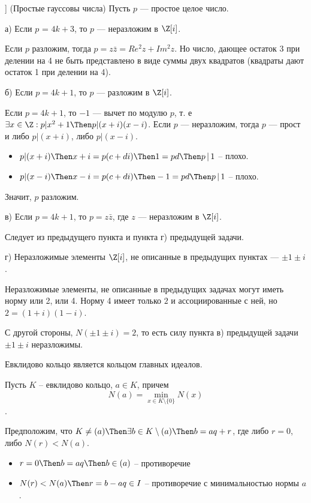 \begin{problem}[11 (3.3) [Каргальцев]]
	(Простые гауссовы числа) Пусть $p$ --- простое целое число.
\end{problem}

\begin{solution}
	
	а) Если \(p\) = \(4k + 3\), то \(p\) --- неразложим в \(\Z[i]\).
	
	Если \(p\) разложим, тогда \(p = z\bar{z} = Re^2z + Im^2z\). Но число, дающее остаток 3 при делении на 4 не быть представлено в виде суммы двух квадратов (квадраты дают остаток 1 при делении на 4).
	
	б) Если \(p = 4k + 1\), то \(p\) --- разложим в \(\Z[i]\).
	
	Если \(p = 4k + 1\), то \(-1\) --- вычет по модулю \(p\), т. е \(\exists x \in \Z: p| x^2 + 1 \Then p | (x + i)(x - i)\). Если \(p\) --- неразложим, тогда \(p\) --- прост и либо \(p| (x + i)\), либо \(p | (x - i)\). 
	
	\begin{itemize}
		\item $p| (x + i)\Then x + i = p(c + di)\Then 1 = pd \Then p\,|\,1$ -- плохо.
		\item $p| (x - i)\Then x - i = p(c + di)\Then -1 = pd \Then p\,|\,1$ -- плохо.
	\end{itemize}
	Значит, \(p\) разложим.
	
	в) Если \(p = 4k + 1\), то \(p = z\bar{z}\), где \(z\) --- неразложим в \(\Z[i]\).
	
	Следует из предыдущего пункта и пункта г) предыдущей задачи.
	
	г) Неразложимые элементы \(\Z[i]\), не описанные в предыдущих пунктах --- \(\pm 1 \pm i\).
	
	Неразложимые элементы, не описанные в предыдущих задачах могут иметь норму или 2, или 4. Норму 4 имеет только \(2\) и ассоциированные с ней, но \(2 = (1 + i)(1 - i)\).
	
	С другой стороны, \(N(\pm 1 \pm i) = 2\), то есть силу пункта в) предыдущей задачи \(\pm 1 \pm i\) неразложимы.
\end{solution}


\begin{problem}[12 (3.10)]
Евклидово кольцо является кольцом главных идеалов.
\end{problem}

\begin{solution}
Пусть $K$ -- евклидово кольцо, $a \in K$, причем \[N(a) = \min_{x\in K \setminus \{0\}}N(x)\].

Предположим, что $K \neq (a) \Then \exists b\in K\setminus (a) \Then b = aq + r$, где либо $r = 0$, либо $N(r) < N(a)$.

\begin{itemize}
	\item $r=0\Then b=aq\Then b \in (a)$ -- противоречие
	\item $N(r) < N(a) \Then r = b-aq \in I$ -- противоречие с минимальностью нормы $a$.
\end{itemize}
\end{solution}

